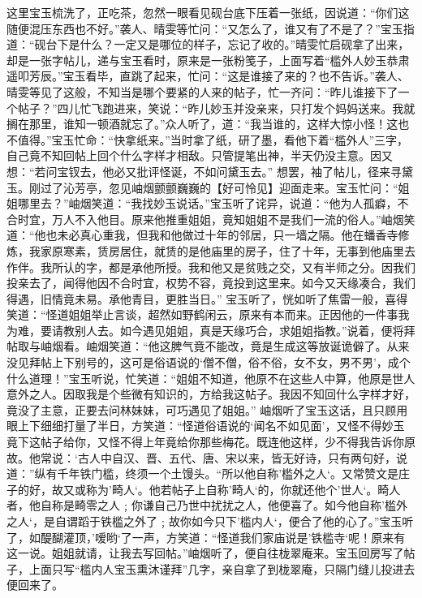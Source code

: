 \documentclass[12pt,oneside]{book}
\begin{document}
这里宝玉梳洗了，正吃茶，忽然一眼看见砚台底下压着一张纸，因说道：“你们这随便混压东西也不好。”袭人、晴雯等忙问：“又怎么了，谁又有了不是了？”宝玉指道：“砚台下是什么？一定又是哪位的样子，忘记了收的。”晴雯忙启砚拿了出来，却是一张字帖儿，递与宝玉看时，原来是一张粉笺子，上面写着“槛外人妙玉恭肃遥叩芳辰。”宝玉看毕，直跳了起来，忙问：“这是谁接了来的？也不告诉。”袭人、晴雯等见了这般，不知当是哪个要紧的人来的帖子，忙一齐问：“昨儿谁接下了一个帖子？”四儿忙飞跑进来，笑说：“昨儿妙玉并没亲来，只打发个妈妈送来。我就搁在那里，谁知一顿酒就忘了。”众人听了，道：“我当谁的，这样大惊小怪！这也不值得。”宝玉忙命：“快拿纸来。”当时拿了纸，研了墨，看他下着“槛外人”三字，自己竟不知回帖上回个什么字样才相敌。只管提笔出神，半天仍没主意。因又想：“若问宝钗去，他必又批评怪诞，不如问黛玉去。”
想罢，袖了帖儿，径来寻黛玉。刚过了沁芳亭，忽见岫烟颤颤巍巍的【好可怜见】迎面走来。宝玉忙问：“姐姐哪里去？”岫烟笑道：“我找妙玉说话。”宝玉听了诧异，说道：“他为人孤癖，不合时宜，万人不入他目。原来他推重姐姐，竟知姐姐不是我们一流的俗人。”岫烟笑道：“他也未必真心重我，但我和他做过十年的邻居，只一墙之隔。他在蟠香寺修炼，我家原寒素，赁房居住，就赁的是他庙里的房子，住了十年，无事到他庙里去作伴。我所认的字，都是承他所授。我和他又是贫贱之交，又有半师之分。因我们投亲去了，闻得他因不合时宜，权势不容，竟投到这里来。如今又天缘凑合，我们得遇，旧情竟未易。承他青目，更胜当日。”
宝玉听了，恍如听了焦雷一般，喜得笑道：“怪道姐姐举止言谈，超然如野鹤闲云，原来有本而来。正因他的一件事我为难，要请教别人去。如今遇见姐姐，真是天缘巧合，求姐姐指教。”说着，便将拜帖取与岫烟看。岫烟笑道：“他这脾气竟不能改，竟是生成这等放诞诡僻了。从来没见拜帖上下别号的，这可是俗语说的‘僧不僧，俗不俗，女不女，男不男’，成个什么道理！”宝玉听说，忙笑道：“姐姐不知道，他原不在这些人中算，他原是世人意外之人。因取我是个些微有知识的，方给我这帖子。我因不知回什么字样才好，竟没了主意，正要去问林妹妹，可巧遇见了姐姐。”
岫烟听了宝玉这话，且只顾用眼上下细细打量了半日，方笑道：“怪道俗语说的‘闻名不如见面’，又怪不得妙玉竟下这帖子给你，又怪不得上年竟给你那些梅花。既连他这样，少不得我告诉你原故。他常说：‘古人中自汉、晋、五代、唐、宋以来，皆无好诗，只有两句好，说道：”纵有千年铁门槛，终须一个土馒头。“所以他自称’槛外之人‘。又常赞文是庄子的好，故又或称为’畸人‘。他若帖子上自称’畸人‘的，你就还他个’世人‘。畸人者，他自称是畸零之人﹔你谦自己乃世中扰扰之人，他便喜了。如今他自称’槛外之人‘，是自谓蹈于铁槛之外了﹔故你如今只下’槛内人‘，便合了他的心了。”宝玉听了，如醍醐灌顶，’嗳哟‘了一声，方笑道：“怪道我们家庙说是’铁槛寺‘呢！原来有这一说。姐姐就请，让我去写回帖。”岫烟听了，便自往栊翠庵来。宝玉回房写了帖子，上面只写“槛内人宝玉熏沐谨拜”几字，亲自拿了到栊翠庵，只隔门缝儿投进去便回来了。
\end{document}
